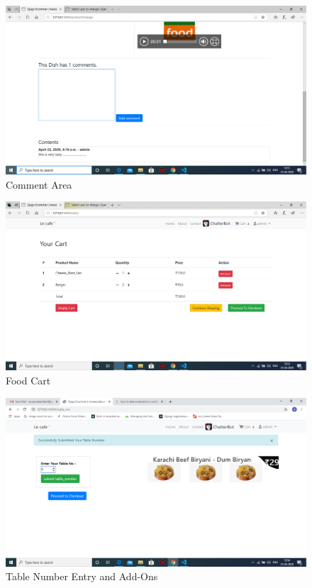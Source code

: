 \documentclass[12pt,a4paper]{report}
\begin{document}
\begin{appendices}
\begin{figure}[h!]
	\centering
	\includegraphics[scale=0.3]{6}
	\caption{Comment Area}
	\label{Architecture}
	\end{figure}

\begin{figure}[h!]
	\centering
	\includegraphics[scale=0.3]{7}
	\caption{Food Cart}
	\label{Architecture}
\end{figure}
		
\begin{figure}[h!]
	\centering
	\includegraphics[scale=0.3]{8}
	\caption{Table Number Entry and Add-Ons}
	\label{Architecture}
	\end{figure}


\end{appendices}
\end{document}
